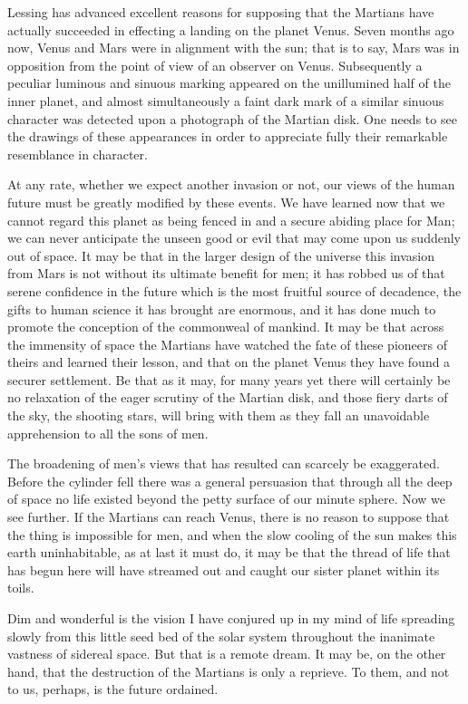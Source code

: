 Lessing has advanced excellent reasons for supposing that the
Martians have actually succeeded in effecting a landing on the
planet Venus. Seven months ago now, Venus and Mars were in
alignment with the sun; that is to say, Mars was in opposition from
the point of view of an observer on Venus. Subsequently a peculiar
luminous and sinuous marking appeared on the unillumined half of
the inner planet, and almost simultaneously a faint dark mark of a
similar sinuous character was detected upon a photograph of the
Martian disk. One needs to see the drawings of these appearances in
order to appreciate fully their remarkable resemblance in
character.

At any rate, whether we expect another invasion or not, our views
of the human future must be greatly modified by these events. We
have learned now that we cannot regard this planet as being fenced
in and a secure abiding place for Man; we can never anticipate the
unseen good or evil that may come upon us suddenly out of space. It
may be that in the larger design of the universe this invasion from
Mars is not without its ultimate benefit for men; it has robbed us
of that serene confidence in the future which is the most fruitful
source of decadence, the gifts to human science it has brought are
enormous, and it has done much to promote the conception of the
commonweal of mankind. It may be that across the immensity of space
the Martians have watched the fate of these pioneers of theirs and
learned their lesson, and that on the planet Venus they have found
a securer settlement. Be that as it may, for many years yet there
will certainly be no relaxation of the eager scrutiny of the
Martian disk, and those fiery darts of the sky, the shooting stars,
will bring with them as they fall an unavoidable apprehension to
all the sons of men.

The broadening of men's views that has resulted can scarcely be
exaggerated. Before the cylinder fell there was a general
persuasion that through all the deep of space no life existed
beyond the petty surface of our minute sphere. Now we see further.
If the Martians can reach Venus, there is no reason to suppose that
the thing is impossible for men, and when the slow cooling of the
sun makes this earth uninhabitable, as at last it must do, it may
be that the thread of life that has begun here will have streamed
out and caught our sister planet within its toils.

Dim and wonderful is the vision I have conjured up in my mind of
life spreading slowly from this little seed bed of the solar system
throughout the inanimate vastness of sidereal space. But that is a
remote dream. It may be, on the other hand, that the destruction of
the Martians is only a reprieve. To them, and not to us, perhaps,
is the future ordained.

